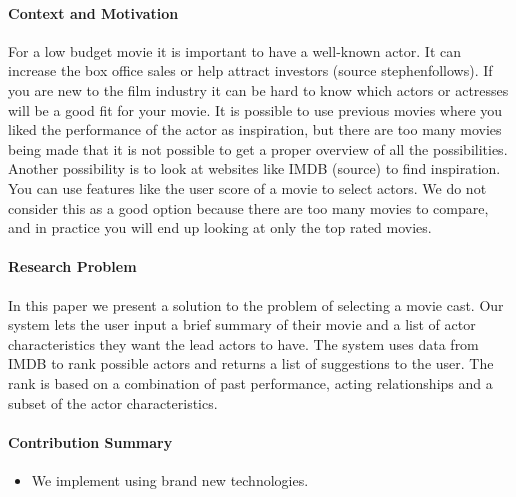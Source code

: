 
\noindent

\paragraph{Context and Motivation}
For a low budget movie it is important to have a well-known actor. It can increase the box office sales or help attract investors (source stephenfollows).
If you are new to the film industry it can be hard to know which actors or actresses will be a good fit for your movie.
It is possible to use previous movies where you liked the performance of the actor as inspiration, but there are too many movies
being made that it is not possible to get a proper overview of all the possibilities. Another possibility is to look at websites like
IMDB (source) to find inspiration. You can use features like the user score of a movie to select actors. We do not consider this
as a good option because there are too many movies to compare, and in practice you will end up looking at only the top rated movies.

\paragraph{Research Problem}
In this paper we present a solution to the problem of selecting a movie cast. Our system lets the user input a brief summary of their
movie and a list of actor characteristics they want the lead actors to have. The system uses data from IMDB to rank possible actors
and returns a list of suggestions to the user. The rank is based on a combination of past performance, acting relationships and
a subset of the actor characteristics. 

\paragraph{Contribution Summary}
\begin{itemize}
\item We implement \paxos using brand new technologies.
\end{itemize}